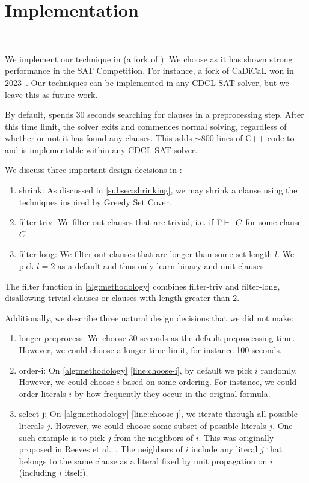 \section{Implementation}~\label{sec:implementation}

We implement our technique in \tool (a fork of \cadical
). We choose \cadical as it has shown strong performance in the SAT Competition.
For instance, a fork of CaDiCaL won in 2023~\cite{satcomp2023}. Our techniques
can be implemented in any CDCL SAT solver, but we leave this as future work.

By default, \tool spends 30 seconds searching for \pr clauses in a preprocessing step. After this time limit, the solver exits and commences normal solving,
regardless of whether or not it has found any \pr clauses. This adds $\sim\!800$ lines
of C++ code to \cadical and is implementable within any CDCL SAT solver.

We discuss three important design decisions in \tool:

\begin{enumerate}
  \item \textsf{shrink}: As discussed in \autoref{subsec:shrinking}, we may
  shrink a clause using the techniques inspired by Greedy Set Cover.
  \item \textsf{filter-triv}: We filter out clauses that are trivial, i.e. if
  $\Gamma \vdash_1 C$ for some clause $C$.
  \item \textsf{filter-long}: We filter out clauses that are longer than some
  set length $l$. We pick $l = 2$ as a default and thus only learn binary and unit
  clauses.
\end{enumerate}

The filter function in \autoref{alg:methodology} combines \textsf{filter-triv} and \textsf{filter-long},
disallowing trivial clauses or clauses with length greater than $2$.

Additionally, we describe three natural design decisions that we did not make:

\begin{enumerate}
  \item \textsf{longer-preprocess}: We choose 30 seconds as the default
  preprocessing time. However, we could choose a longer time limit, for instance
  100 seconds.
  \item \textsf{order-i}: On \autoref{alg:methodology} \autoref{line:choose-i},
  by default we pick $i$ randomly. However, we could choose $i$ based
  on some ordering. For instance, we could order literals $i$ by how frequently
  they occur in the original formula.
  \item \textsf{select-j}: On \autoref{alg:methodology} \autoref{line:choose-j},
  we iterate through all possible literals $j$. However, we
  could choose some subset of possible literals $j$. One such example is to pick $j$ from 
  the neighbors of $i$. This was originally proposed in Reeves et al.~\cite{prelearn}.
  The neighbors of $i$ include any literal $j$ that belongs to the same clause as
  a literal fixed by unit propagation on $i$ (including $i$ itself).
\end{enumerate}

